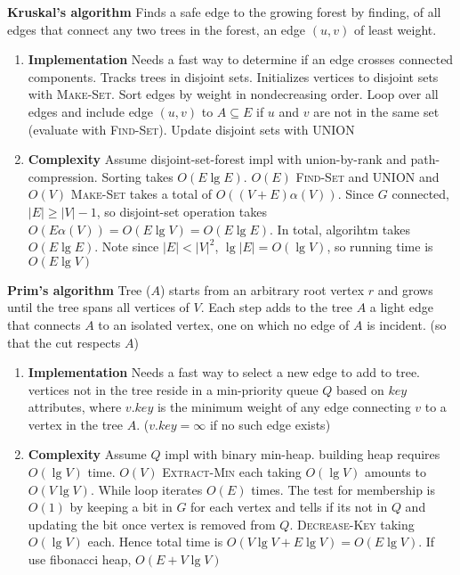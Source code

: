 \documentclass[11pt]{article}
\begin{document}
\begin{defn*}
    \textbf{Kruskal's algorithm} Finds a safe edge to the growing forest by finding, of all edges that connect any two trees in the forest, an edge $(u,v)$ of least weight.
    \begin{enumerate}
        \item \textbf{Implementation} Needs a fast way to determine if an edge crosses connected components. Tracks trees in disjoint sets. Initializes vertices to disjoint sets with \textsc{Make-Set}. Sort edges by weight in nondecreasing order. Loop over all edges and include edge $(u,v)$ to $A\subseteq E$ if $u$ and $v$ are not in the same set (evaluate with \textsc{Find-Set}). Update disjoint sets with \textsc{UNION}
        \item \textbf{Complexity} Assume disjoint-set-forest impl with union-by-rank and path-compression. Sorting takes $O(E\lg E)$. $O(E)$ \textsc{Find-Set} and \textsc{UNION} and $O(V)$ \textsc{Make-Set} takes a total of $O((V+E)\alpha(V))$. Since $G$ connected, $|E| \geq |V| - 1$, so disjoint-set operation takes $O(E\alpha(V)) = O(E\lg V) = O(E\lg E)$. In total, algorihtm takes $O(E\lg E)$. Note since $|E| < |V|^2$, $\lg |E| = O(\lg V)$, so running time is $O(E\lg V)$
    \end{enumerate}
\end{defn*}



\begin{defn*}
    \textbf{Prim's algorithm} Tree ($A$) starts from an arbitrary root vertex $r$ and grows until the tree spans all vertices of $V$. Each step adds to the tree $A$ a light edge that connects $A$ to an isolated vertex, one on which no edge of $A$ is incident. (so that the cut respects $A$)
    \begin{enumerate}
        \item \textbf{Implementation} Needs a fast way to select a new edge to add to tree. vertices not in the tree reside in a min-priority queue $Q$ based on $key$ attributes, where $v.key$ is the minimum weight of any edge connecting $v$ to a vertex in the tree $A$. ($v.key = \infty$ if no such edge exists) 
        \item \textbf{Complexity} Assume $Q$ impl with binary min-heap. building heap requires $O(\lg V)$ time. $O(V)$ \textsc{Extract-Min} each taking $O(\lg V)$ amounts to $O(V\lg V)$. While loop iterates $O(E)$ times. The test for membership is $O(1)$ by keeping a bit in $G$ for each vertex and tells if its not in $Q$ and updating the bit once vertex is removed from $Q$. \textsc{Decrease-Key} taking $O(\lg V)$ each. Hence total time is $O(V\lg V + E\lg V) = O(E\lg V)$. If use fibonacci heap, $O(E + V\lg V)$
    \end{enumerate}
\end{defn*}
\end{document}
